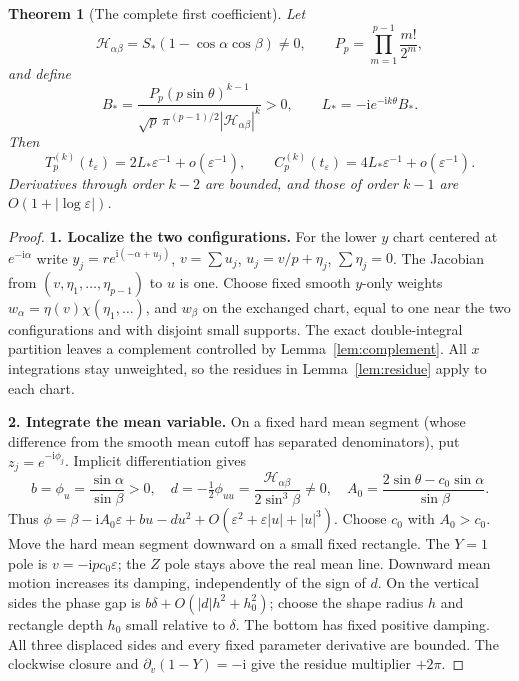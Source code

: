 \documentclass[11pt]{article}
\numberwithin{equation}{section}
\newtheorem{theorem}{Theorem}[section]
\theoremstyle{definition}
\newcommand{\ii}{\mathrm i}
\newcommand{\eps}{\varepsilon}
\newcommand{\Hpair}{\mathcal H_{\alpha\beta}}
\begin{document}
\begin{theorem}[The complete first coefficient]\label{thm:first}
Let
\[
 \Hpair=S_*(1-\cos\alpha\cos\beta)\ne0,
 \qquad P_p=\prod_{m=1}^{p-1}\frac{m!}{2^m},
\]
and define
\begin{equation}
 B_* =\frac{P_p(p\sin\theta)^{k-1}}
 {\sqrt p\,\pi^{(p-1)/2}|\Hpair|^k}>0,
 \qquad L_*=-\ii e^{-\ii k\theta}B_*.
 \label{eq:amplitudeclosed}
\end{equation}
Then
\[
 T_p^{(k)}(t_\eps)=2L_*\eps^{-1}+o(\eps^{-1}),\qquad
 C_p^{(k)}(t_\eps)=4L_*\eps^{-1}+o(\eps^{-1}).
\]
Derivatives through order $k-2$ are bounded, and those of order
$k-1$ are $O(1+|\log\eps|)$.
\end{theorem}
\begin{proof}
\noindent\textbf{1. Localize the two configurations.} For the lower $y$ chart centered at $e^{-\ii\alpha}$ write
$y_j=r e^{\ii(-\alpha+u_j)}$, $v=\sum u_j$,
$u_j=v/p+\eta_j$, $\sum\eta_j=0$. The Jacobian from
$(v,\eta_1,\ldots,\eta_{p-1})$ to $u$ is one. Choose fixed
smooth $y$-only weights $w_\alpha=\eta(v)\chi(\eta_1,\ldots)$,
and $w_\beta$ on the exchanged chart, equal to one near the two
configurations and with disjoint small supports. The exact
double-integral partition leaves a complement controlled by
Lemma~\ref{lem:complement}. All $x$ integrations stay unweighted,
so the residues in Lemma~\ref{lem:residue} apply to each chart.

\par\smallskip\noindent\textbf{2. Integrate the mean variable.} On a fixed hard mean segment (whose difference from the smooth
mean cutoff has separated denominators), put $z_j=e^{-\ii\phi_j}$.
Implicit differentiation gives
\[
 b=\phi_u=\frac{\sin\alpha}{\sin\beta}>0,\quad
 d=-\tfrac12\phi_{uu}=\frac{\Hpair}{2\sin^3\beta}\ne0,
 \quad A_0=\frac{2\sin\theta-c_0\sin\alpha}{\sin\beta}.
\]
Thus
$\phi=\beta-\ii A_0\eps+bu-du^2+
O(\eps^2+\eps|u|+|u|^3)$. Choose $c_0$ with $A_0>c_0$.
Move the hard mean segment downward on a small fixed rectangle.
The $Y=1$ pole is $v=-\ii pc_0\eps$; the $Z$ pole stays above
the real mean line. Downward mean motion increases its damping,
independently of the sign of $d$. On the vertical sides the phase
gap is $b\delta+O(|d|h^2+h_0^2)$; choose the shape radius $h$
and rectangle depth $h_0$ small relative to $\delta$. The bottom
has fixed positive damping. All three displaced sides and every
fixed parameter derivative are bounded. The clockwise closure and
$\partial_v(1-Y)=-\ii$ give the residue multiplier $+2\pi$.


\end{proof}
\end{document}
